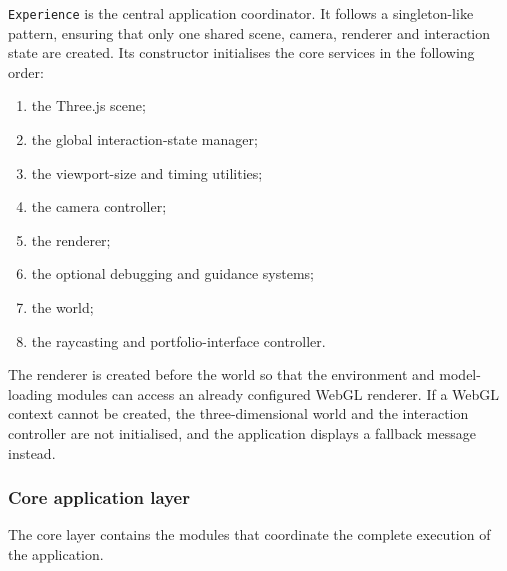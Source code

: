 \documentclass{report}
\begin{document}
\texttt{Experience} is the central application coordinator. It follows
a singleton-like pattern, ensuring that only one shared scene, camera,
renderer and interaction state are created. Its constructor initialises
the core services in the following order:

\begin{enumerate}
    \item the Three.js scene;
    \item the global interaction-state manager;
    \item the viewport-size and timing utilities;
    \item the camera controller;
    \item the renderer;
    \item the optional debugging and guidance systems;
    \item the world;
    \item the raycasting and portfolio-interface controller.
\end{enumerate}

The renderer is created before the world so that the environment and
model-loading modules can access an already configured WebGL renderer.
If a WebGL context cannot be created, the three-dimensional world and
the interaction controller are not initialised, and the application
displays a fallback message instead.

\subsubsection{Core application layer}

The core layer contains the modules that coordinate the complete
execution of the application.
\end{document}

